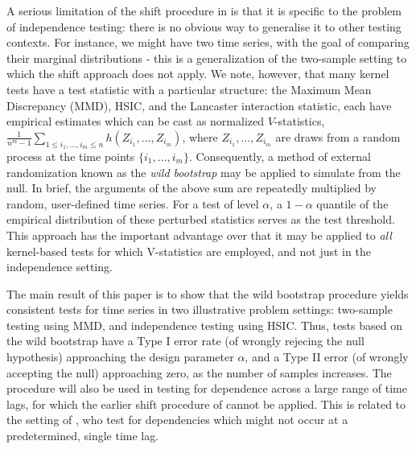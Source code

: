 \documentclass{article} %
\begin{document}
A serious limitation of the shift procedure in \cite{chwialkowski2014kernel} is that it is specific
to the problem of independence testing: there is no obvious way to generalise it to  other
testing contexts. For instance, we might have two time series, with the goal of comparing
their marginal distributions - this is a generalization of the two-sample setting to which the shift
approach does not apply.
 We note, however, that many kernel tests have a test statistic with a particular structure:  the Maximum Mean Discrepancy (MMD), HSIC, and the Lancaster interaction statistic,
each have empirical estimates which can be cast as normalized $V$-statistics,
$\frac{1} {n^m-1} \sum_{1\leq i_1,...,i_m \leq n} h(Z_{i_1},...,Z_{i_m})$,
where $Z_{i_1},...,Z_{i_m}$ are draws from a random process at the time points $\{i_1,\ldots,i_m\}$. Consequently,
a method of external randomization known as the {\em wild bootstrap} may be applied  \cite{leucht_dependent_2013,Shao2010} to simulate from the null.
In brief, the arguments of the above sum are repeatedly multiplied by random, user-defined time series. For a test of level
$\alpha$, a $1-\alpha$ quantile of the empirical distribution of these perturbed statistics serves as the test threshold. This approach has the important advantage over \cite{chwialkowski2014kernel} that it may be applied to {\em all} kernel-based tests for which V-statistics are employed, and not just in the independence setting.

The main result of this paper is to show that the wild bootstrap procedure yields consistent tests for time series in
 two illustrative problem settings:
two-sample testing using MMD, and independence testing using HSIC. Thus, tests based on the wild bootstrap  have a Type I error rate (of wrongly rejecing the null hypothesis) approaching the design parameter $\alpha$, and a Type II error (of wrongly accepting the null) approaching zero, as the number of samples increases. The procedure will also be used in testing for dependence across a large range of time lags, for which the earlier shift procedure of \cite{chwialkowski2014kernel} cannot be applied. This is related to the setting of \cite{besserve_statistical_2013}, who test for dependencies which might not occur at a predetermined, single time lag.




\end{document}
